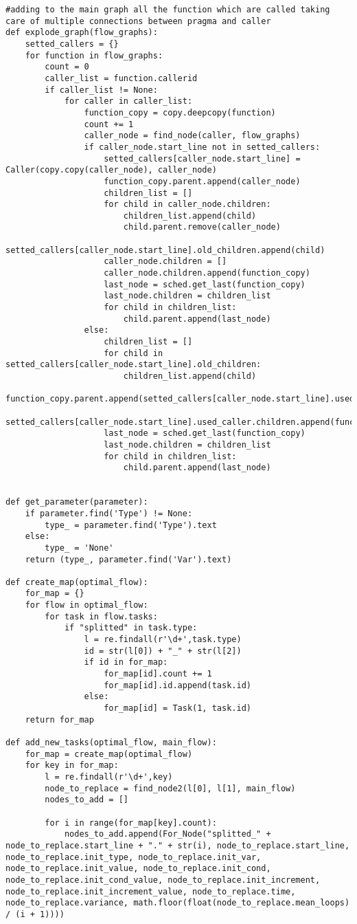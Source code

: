 \documentclass[a4paper,11pt,twoside]{book}
\begin{document}
\begin{lstlisting}[language=CCC, caption=pargraph.py]
#adding to the main graph all the function which are called taking care of multiple connections between pragma and caller
def explode_graph(flow_graphs):
	setted_callers = {}
	for function in flow_graphs:
		count = 0
		caller_list = function.callerid
		if caller_list != None:
			for caller in caller_list:
				function_copy = copy.deepcopy(function)
				count += 1
				caller_node = find_node(caller, flow_graphs)
				if caller_node.start_line not in setted_callers:
					setted_callers[caller_node.start_line] = Caller(copy.copy(caller_node), caller_node)
					function_copy.parent.append(caller_node)
					children_list = []
					for child in caller_node.children:
						children_list.append(child)
						child.parent.remove(caller_node)
						setted_callers[caller_node.start_line].old_children.append(child)
					caller_node.children = []
					caller_node.children.append(function_copy)
					last_node = sched.get_last(function_copy)
					last_node.children = children_list
					for child in children_list:
						child.parent.append(last_node)
				else:
					children_list = []
					for child in setted_callers[caller_node.start_line].old_children:
						children_list.append(child)
					function_copy.parent.append(setted_callers[caller_node.start_line].used_caller)
					setted_callers[caller_node.start_line].used_caller.children.append(function_copy)
					last_node = sched.get_last(function_copy)
					last_node.children = children_list
					for child in children_list:
						child.parent.append(last_node)


def get_parameter(parameter):
	if parameter.find('Type') != None:
		type_ = parameter.find('Type').text
	else:
		type_ = 'None'
	return (type_, parameter.find('Var').text)

def create_map(optimal_flow):
	for_map = {}
	for flow in optimal_flow:
		for task in flow.tasks:
			if "splitted" in task.type:
				l = re.findall(r'\d+',task.type)
				id = str(l[0]) + "_" + str(l[2])
				if id in for_map:
					for_map[id].count += 1
					for_map[id].id.append(task.id)
				else:
					for_map[id] = Task(1, task.id)
	return for_map

def add_new_tasks(optimal_flow, main_flow):
	for_map = create_map(optimal_flow)
	for key in for_map:
		l = re.findall(r'\d+',key)
		node_to_replace = find_node2(l[0], l[1], main_flow)
		nodes_to_add = []

		for i in range(for_map[key].count):
			nodes_to_add.append(For_Node("splitted_" + node_to_replace.start_line + "." + str(i), node_to_replace.start_line, node_to_replace.init_type, node_to_replace.init_var, node_to_replace.init_value, node_to_replace.init_cond, node_to_replace.init_cond_value, node_to_replace.init_increment, node_to_replace.init_increment_value, node_to_replace.time, node_to_replace.variance, math.floor(float(node_to_replace.mean_loops) / (i + 1))))


\end{lstlisting}
\end{document}
